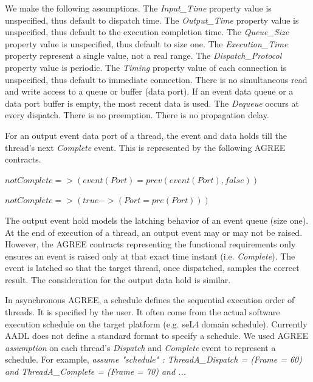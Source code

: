 We make the following assumptions. The \emph{Input\_Time} property value is unspecified, thus default to dispatch time. The \emph{Output\_Time} property value is unspecified, thus default to the execution completion time. The \emph{Queue\_Size} property value is unspecified, thus default to size one. The \emph{Execution\_Time} property represent a single value, not a real range. The \emph{Dispatch\_Protocol} property value is periodic. The \emph{Timing} property value of each connection is unspecified, thus default to immediate connection. There is no simultaneous read and write access to a queue or buffer (data port). If an event data queue or a data port buffer is empty, the most recent data is used. The \emph{Dequeue} occurs at every dispatch. There is no preemption. There is no propagation delay.

For an output event data port of a thread, the event and data holds till the thread's next \emph{Complete} event. This is represented by the following AGREE contracts.

\begin{math} 
not Complete => (event(Port) = prev(event(Port), false))
\end{math} 

\begin{math}
not Complete => (true -> (Port = pre(Port)))
\end{math}  

The output event hold models the latching behavior of an event queue (size one). At the end of execution of a thread, an output event may or may not be raised. However, the AGREE contracts representing the functional requirements only ensures an event is raised only at that exact time instant (i.e. \emph{Complete}). The event is latched so that the target thread, once dispatched, samples the correct result. The consideration for the output data hold is similar.
 
In asynchronous AGREE, a schedule defines the sequential execution order of threads. It is specified by the user. It often come from the actual software execution schedule on the target platform (e.g. seL4 domain schedule). Currently AADL does not define a standard format to specify a schedule. We used AGREE \emph{assumption} on each thread's \emph{Dispatch} and \emph{Complete} event to represent a schedule. For example, \emph{assume "schedule" :			ThreadA\_Dispatch = (Frame = 60) and ThreadA\_Complete = (Frame = 70) and ...}